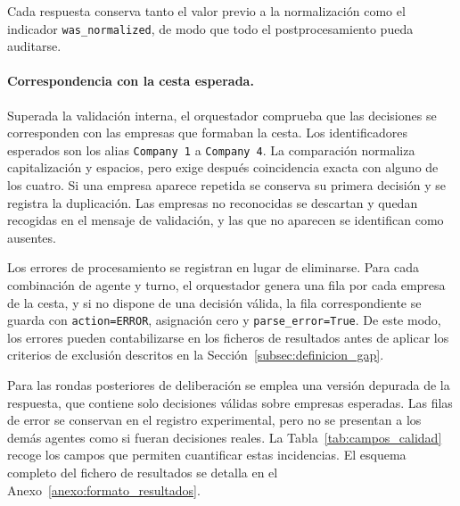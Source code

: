 Cada respuesta conserva tanto el valor previo a la normalización como el indicador \texttt{was\_normalized}, de modo que todo el postprocesamiento pueda auditarse.

\paragraph{Correspondencia con la cesta esperada.}
Superada la validación interna, el orquestador comprueba que las decisiones se corresponden con las empresas que formaban la cesta. Los identificadores esperados son los alias \texttt{Company 1} a \texttt{Company 4}. La comparación normaliza capitalización y espacios, pero exige después coincidencia exacta con alguno de los cuatro. Si una empresa aparece repetida se conserva su primera decisión y se registra la duplicación. Las empresas no reconocidas se descartan y quedan recogidas en el mensaje de validación, y las que no aparecen se identifican como ausentes.

Los errores de procesamiento se registran en lugar de eliminarse. Para cada combinación de agente y turno, el orquestador genera una fila por cada empresa de la cesta, y si no dispone de una decisión válida, la fila correspondiente se guarda con \texttt{action=ERROR}, asignación cero y \texttt{parse\_error=True}. De este modo, los errores pueden contabilizarse en los ficheros de resultados antes de aplicar los criterios de exclusión descritos en la Sección~\ref{subsec:definicion_gap}.

Para las rondas posteriores de deliberación se emplea una versión depurada de la respuesta, que contiene solo decisiones válidas sobre empresas esperadas. Las filas de error se conservan en el registro experimental, pero no se presentan a los demás agentes como si fueran decisiones reales. La Tabla~\ref{tab:campos_calidad} recoge los campos que permiten cuantificar estas incidencias. El esquema completo del fichero de resultados se detalla en el Anexo~\ref{anexo:formato_resultados}.

